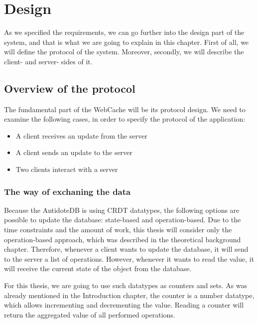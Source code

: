 \chapter{Design}
\label{Design}

As we specified the requirements, we can go further into the design part of the system, and that is what we are going to explain in this chapter. 
First of all, we will define the protocol of the system. Moreover, secondly, we will describe the client- and server- sides of it.

\section{Overview of the protocol}

The fundamental part of the WebCache will be its protocol design. We need to examine the following cases, in order to specify the protocol of the application:

    \begin{itemize}
        \item {A client receives an update from the server}
        \item {A client sends an update to the server}
        \item {Two clients interact with a server}
    \end{itemize}

\subsection{The way of exchaning the data}

Because the AntidoteDB is using CRDT datatypes, the following options are possible to update the database: state-based and operation-based. Due to the time constraints and the amount of work, this thesis will consider only the operation-based approach, which was described in the theoretical background chapter. Therefore, whenever a client wants to update the database, it will send to the server a list of operations. However, whenever it wants to read the value, it will receive the current state of the object from the database.

For this thesis, we are going to use such datatypes as counters and sets. As was already mentioned in the Introduction chapter, the counter is a number datatype, which allows incrementing and decrementing the value. Reading a counter will return the aggregated value of all performed operations. 




